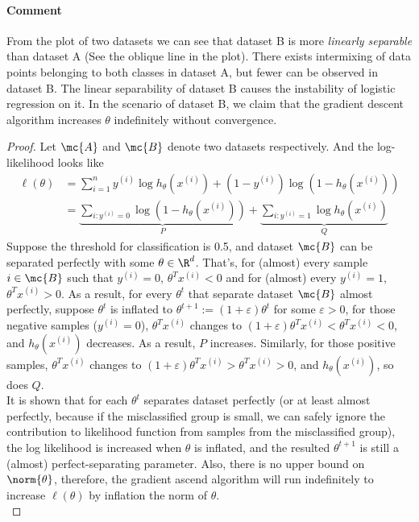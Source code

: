 \documentclass[11pt]{article}
\newcommand{\upi}[0]{^{(i)}}
\begin{document}
	\paragraph{Comment} From the plot of two datasets we can see that dataset B is more \emph{linearly separable} than dataset A (See the oblique line in the plot). There exists intermixing of data points belonging to both classes in dataset A, but fewer can be observed in dataset B. The linear separability of dataset B causes the instability of logistic regression on it. In the scenario of dataset B, we claim that the gradient descent algorithm increases $\theta$ indefinitely without convergence.
	\begin{proof}
		Let $\mc{A}$ and $\mc{B}$ denote two datasets respectively.
		And the log-likelihood looks like
		\begin{align}
			\ell (\theta) &= \sum_{i=1}^{n} y^{(i)} \log h_\theta\left(x^{(i)}\right)+\left(1-y^{(i)}\right) \log \left(1-h_\theta\left(x^{(i)}\right)\right) \\
			&= \underbrace{\sum_{i: y\upi = 0} \log \left(1 - h_\theta(x\upi)\right)}_{P} + 
			\underbrace{\sum_{i: y\upi = 1} \log h_\theta(x\upi)}_{Q}
		\end{align}
		Suppose the threshold for classification is 0.5, and dataset $\mc{B}$ can be separated perfectly with some $\theta \in \R^d$. That's, for (almost) every sample $i \in \mc{B}$ such that $y\upi = 0$, $\theta^T x\upi < 0$ and for (almost) every $y\upi = 1$, $\theta^T x\upi > 0$. As a result, for every $\theta^t$ that separate dataset $\mc{B}$ almost perfectly, suppose $\theta^t$ is inflated to $\theta^{t+1} := (1 + \varepsilon) \theta^t$ for some $\varepsilon > 0$, for those negative samples ($y\upi = 0$), $\theta^T x\upi$ changes to $(1 + \varepsilon) \theta^T x\upi < \theta^T x\upi < 0$, and $h_\theta(x\upi)$ decreases. As a result, $P$ increases. Similarly, for those positive samples, $\theta^T x\upi$ changes to $(1 + \varepsilon) \theta^T x\upi > \theta^T x\upi > 0$, and $h_\theta(x\upi)$, so does $Q$.\\
		It is shown that for each $\theta^t$ separates dataset perfectly (or at least almost perfectly, because if the misclassified group is small, we can safely ignore the contribution to likelihood function from samples from the misclassified group), the log likelihood is increased when $\theta$ is inflated, and the resulted $\theta^{t+1}$ is still a (almost) perfect-separating parameter. Also, there is no upper bound on $\norm{\theta}$, therefore, the gradient ascend algorithm will run indefinitely to increase $\ell(\theta)$ by inflation the norm of $\theta$.\\

\end{proof}
\end{document}
